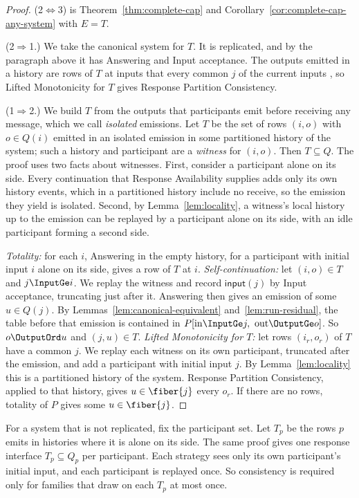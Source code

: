 \begin{proof}
(2$\Leftrightarrow$3) is Theorem~\ref{thm:complete-cap} and
Corollary~\ref{cor:complete-cap-any-system} with $E=T$.

(2$\Rightarrow$1.)  We take the canonical system for $T$.  It is replicated, and by the
paragraph above it has Answering and Input acceptance.  The outputs emitted in
a history are rows of $T$ at inputs that every common \indesc $j$ of the
current inputs \inrel, so Lifted Monotonicity for $T$ gives Response Partition
Consistency.

(1$\Rightarrow$2.)  We build $T$ from the outputs that participants emit
before receiving any message, which we call \emph{isolated} emissions.  Let
$T$ be the set of rows $(i,o)$ with $o\in Q(i)$ emitted in an isolated
emission in some partitioned history of the system; such a history and
participant are a \emph{witness} for $(i,o)$.  Then $T\subseteq Q$.  The
proof uses two facts about witnesses.  First, consider a participant alone on
its side.  Every continuation that Response Availability supplies adds only
its own history events, which in a partitioned history include no receive, so
the emission they yield is isolated.  Second, by Lemma~\ref{lem:locality}, a
witness's local history up to the emission can be replayed by a participant
alone on its side, with an idle participant forming a second side.

\emph{Totality:} for each $i$, Answering in the empty history, for a
participant with initial input $i$ alone on its side, gives a row of $T$ at
$i$.  \emph{Self-continuation:} let $(i,o)\in T$ and $j\InputGe i$.  We replay
the witness and record $\mathsf{input}(j)$ by Input acceptance, truncating
just after it.  Answering then gives an emission of some $u\in Q(j)$.  By
Lemmas~\ref{lem:canonical-equivalent} and~\ref{lem:run-residual}, the table
before that emission is contained in $P[\mathrm{in}\InputGe j,\
\mathrm{out}\OutputGe o]$.  So $o\OutputOrd u$ and $(j,u)\in T$.
\emph{Lifted Monotonicity for $T$:} let rows $(i_r,o_r)$ of $T$ have a common
\indesc $j$.  We replay each witness on its own participant, truncated after
the emission, and add a participant with initial input $j$.  By
Lemma~\ref{lem:locality} this is a partitioned history of the system.
Response Partition Consistency, applied to that history, gives
$u\in\fiber{j}$ \outrelpart every $o_r$.  If there are no rows, totality of
$P$ gives some $u\in\fiber{j}$.
\end{proof}

\begin{remark}
For a system that is not replicated, fix the participant set.  Let $T_p$ be
the rows $p$ emits in histories where it is alone on its side.  The same proof
gives one response interface $T_p\subseteq Q_p$ per participant.  Each
strategy sees only its own participant's initial input, and each participant
is replayed once.  So consistency is required only for families that draw on
each $T_p$ at most once.
\end{remark}

